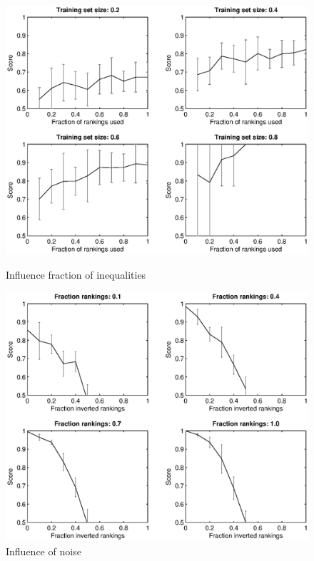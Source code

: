 \documentclass{llncs}
\begin{document}
\begin{figure}
  \begin{minipage}{0.5\textwidth}

  \centering
    \includegraphics[width=1.1\linewidth]{rankings}
  \caption{Influence fraction of inequalities}
  \label{fig:fractie}

  \end{minipage}
  \begin{minipage}{0.5\textwidth}

      \centering
        \includegraphics[width=1.1\linewidth]{noise}
      \caption{Influence of noise}
      \label{fig:ruis}

  \end{minipage}
    \end{figure}
\end{document}
